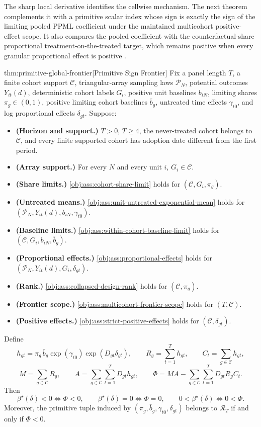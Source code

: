 The sharp local derivative identifies the cellwise mechanism. The next theorem complements it with a primitive scalar index whose sign is exactly the sign of the limiting pooled PPML coefficient under the maintained multicohort positive-effect scope. It also compares the pooled coefficient with the counterfactual-share proportional treatment-on-the-treated target, which remains positive when every granular proportional effect is positive \citep{MoreauKastler2025PTT}.

\begin{theoremv}{thm:primitive-global-frontier}[Primitive Sign Frontier]
Fix a panel length \(T\), a finite cohort support \(\mathcal C\), triangular-array sampling laws \(\mathcal P_N\), potential outcomes \(Y_{it}(d)\), deterministic cohort labels \(G_i\), positive unit baselines \(b_{iN}\), limiting shares \(\pi_g\in(0,1)\), positive limiting cohort baselines \(\bar b_g\), untreated time effects \(\gamma_{t0}\), and log proportional effects \(\delta_{gt}\). Suppose:
\begin{itemize}
\item \textbf{(Horizon and support.)} \(T>0\), \(T\ge 4\), the never-treated cohort belongs to \(\mathcal C\), and every finite supported cohort has adoption date different from the first period.
\item \textbf{(Array support.)} For every \(N\) and every unit \(i\), \(G_i\in\mathcal C\).
\item \textbf{(Share limits.)} \cref{obj:ass:cohort-share-limit} holds for \((\mathcal C,G_i,\pi_g)\).
\item \textbf{(Untreated means.)} \cref{obj:ass:unit-untreated-exponential-mean} holds for \((\mathcal P_N,Y_{it}(d),b_{iN},\gamma_{t0})\).
\item \textbf{(Baseline limits.)} \cref{obj:ass:within-cohort-baseline-limit} holds for \((\mathcal C,G_i,b_{iN},\bar b_g)\).
\item \textbf{(Proportional effects.)} \cref{obj:ass:proportional-effects} holds for \((\mathcal P_N,Y_{it}(d),G_i,\delta_{gt})\).
\item \textbf{(Rank.)} \cref{obj:ass:collapsed-design-rank} holds for \((\mathcal C,\pi_g)\).
\item \textbf{(Frontier scope.)} \cref{obj:ass:multicohort-frontier-scope} holds for \((T,\mathcal C)\).
\item \textbf{(Positive effects.)} \cref{obj:ass:strict-positive-effects} holds for \((\mathcal C,\delta_{gt})\).
\end{itemize}
Define
\[
h_{gt}
=
\pi_g\,\bar b_g\exp(\gamma_{t0})\exp(D_{gt}\delta_{gt}),
\qquad
R_g=\sum_{t=1}^T h_{gt},
\qquad
C_t=\sum_{g\in\mathcal C} h_{gt},
\]
\[
M=\sum_{g\in\mathcal C}R_g,
\qquad
A=\sum_{g\in\mathcal C}\sum_{t=1}^T D_{gt}h_{gt},
\qquad
\Phi
=
MA-\sum_{g\in\mathcal C}\sum_{t=1}^T D_{gt}R_gC_t .
\]
Then
\[
\beta^\star(\delta)<0\iff \Phi<0,\qquad
\beta^\star(\delta)=0\iff \Phi=0,\qquad
0<\beta^\star(\delta)\iff 0<\Phi .
\]
Moreover, the primitive tuple induced by \((\pi_g,\bar b_g,\gamma_{t0},\delta_{gt})\) belongs to \(\mathcal R_T\) if and only if \(\Phi<0\).


\end{theoremv}
